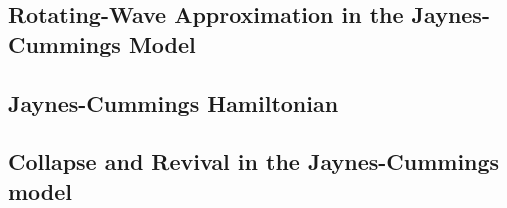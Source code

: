 % 


% 

% 
% 
% 


% 
% 

% 
% 


% 
% 


\setcounter{section}{5}
\setcounter{subsection}{0}
\subsection{Rotating-Wave Approximation in the Jaynes-Cummings Model}

\subsection{Jaynes-Cummings Hamiltonian}

\newpage
\subsection{Collapse and Revival in the Jaynes-Cummings model}





% 


